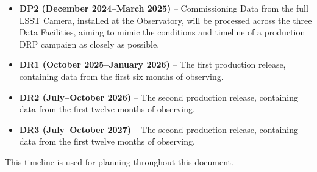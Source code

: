 \begin{itemize}
\item {\bf DP2 (December 2024--March 2025)} – Commissioning Data from
  the full LSST Camera, installed at the Observatory, will be
  processed across the three Data Facilities, aiming to mimic the
  conditions and timeline of a production DRP campaign as closely as
  possible.

\item {\bf DR1 (October 2025--January 2026)} -- The first production release,
  containing data from the first six months of observing.
  
\item {\bf DR2 (July--October 2026)} -- The second production release,
  containing data from the first twelve months of observing.
  
\item {\bf DR3 (July--October 2027)} -- The second production release,
  containing data from the first twelve months of observing.
  
\end{itemize}

This timeline is used for planning throughout this document.
